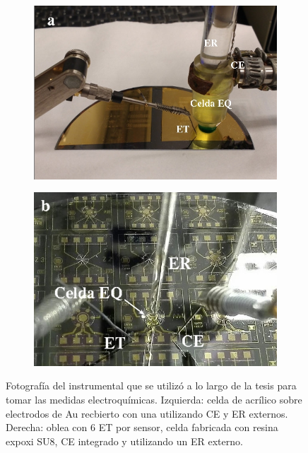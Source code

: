 					 \begin{figure}[t!]
			  		 \begin{subfigure}[t]{0.495\textwidth}
			  		  \includegraphics[width=\textwidth]{Imagenes/EQ1.jpg}
			  		  \end{subfigure}
			  		  \begin{subfigure}[t]{0.495\textwidth}
			  		  \includegraphics[width=\textwidth]{Imagenes/EQ2.jpg}
			  		  \end{subfigure}
			  \caption[Equipo para realizar la medidas electroquímicas]{Fotografía del instrumental que se utilizó a lo largo de la tesis para tomar las medidas electroquímicas. Izquierda: celda de acrílico sobre electrodos de Au recbierto con una \pdm\space utilizando CE y ER externos. Derecha: oblea con 6 ET por sensor, celda fabricada con resina expoxi SU8, CE integrado y utilizando un ER externo.}
			  		 \label{fig:celda}
			 		 \end{figure}


